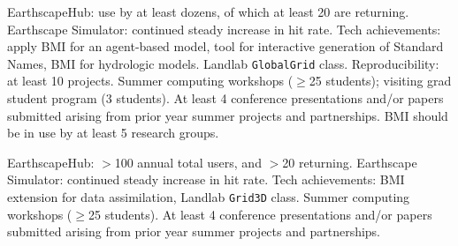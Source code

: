 EarthscapeHub: use by at least dozens, of which at least 20 are returning. Earthscape Simulator: continued steady increase in hit rate. Tech achievements: apply BMI for an agent-based model, tool for interactive generation of Standard Names, BMI for hydrologic models. Landlab \texttt{GlobalGrid} class. Reproducibility: at least 10 projects. Summer computing workshops ($\ge$25 students); visiting grad student program (3 students). At least 4 conference presentations and/or papers submitted arising from prior year summer projects and partnerships. BMI should be in use by at least 5 research groups.

EarthscapeHub: $>$100 annual total users, and $>$20 returning. Earthscape Simulator: continued steady increase in hit rate. Tech achievements: BMI extension for data assimilation, Landlab \texttt{Grid3D} class. Summer computing workshops ($\ge$25 students). At least 4 conference presentations and/or papers submitted arising from prior year summer projects and partnerships.
